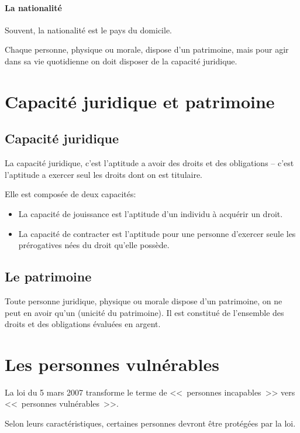 \documentclass[10pt,a4paper]{article}
\begin{document}
\paragraph{La nationalité}

Souvent, la nationalité est le pays du domicile.

Chaque personne, physique ou morale, dispose d'un patrimoine, mais pour agir dans sa vie quotidienne on doit disposer de la capacité juridique.

\section{Capacité juridique et patrimoine\label{capacité}}

\subsection{Capacité juridique}

La capacité juridique, c'est l'aptitude a avoir des droits et des obligations -- c'est l'aptitude a exercer seul les droits dont on est titulaire.

Elle est composée de deux capacités:
\begin{itemize}
\item La capacité de jouissance est l'aptitude d'un individu à acquérir un droit.

\item La capacité de contracter est l'aptitude pour une personne d'exercer seule les prérogatives nées du droit qu'elle possède.
\end{itemize}

\subsection{Le patrimoine}

Toute personne juridique, physique ou morale dispose d'un patrimoine, on ne peut en avoir qu'un (unicité du patrimoine). Il est constitué de l'ensemble des droits et des obligations évaluées en argent.

\section{Les personnes vulnérables}

La loi du 5 mars 2007 transforme le terme de <<~personnes incapables~>> vers <<~personnes vulnérables~>>.

Selon leurs caractéristiques, certaines personnes devront être protégées par la loi.
\end{document}
